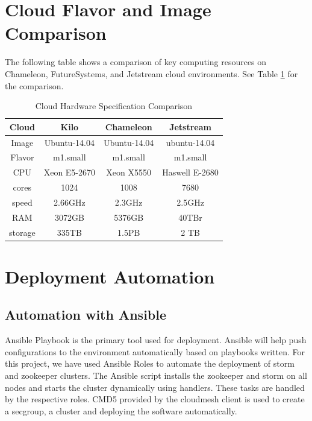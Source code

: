 \documentclass[9pt,twocolumn,twoside]{../../styles/osajnl}
\begin{document}
\section{Cloud Flavor and Image Comparison}
The following table shows a comparison of key computing resources on Chameleon, 
FutureSystems, and Jetstream cloud environments. See Table 
\ref{tab:cloud-comparison} for the comparison.

\begin{table}[h!]
\centering
\caption{ Cloud Hardware Specification Comparison }

\begin{tabular} {|c||c||c||c|}
\hline Cloud & Kilo & Chameleon & Jetstream \\ [0.5ex] \hline Image &
Ubuntu-14.04 & Ubuntu-14.04 & ubuntu-14.04 \\ \hline Flavor &m1.small
&m1.small & m1.small \\ \hline CPU & Xeon E5-2670 & Xeon X5550 &
Haswell E-2680 \\ \hline cores & 1024 & 1008 & 7680 \\ \hline speed &
2.66GHz & 2.3GHz & 2.5GHz\\ \hline RAM & 3072GB & 5376GB &
40TBr\\ \hline storage & 335TB & 1.5PB & 2 TB\\ [1ex] \hline
\end{tabular}
  \label{tab:cloud-comparison}
\end{table}

\section{Deployment Automation}

\subsection{Automation with Ansible}
Ansible Playbook is the primary tool used for deployment. Ansible will
help push configurations to the environment automatically based on
playbooks written. For this project, we have used Ansible Roles to
automate the deployment of storm and zookeeper clusters. The Ansible
script installs the zookeeper and storm on all nodes and starts the
cluster dynamically using handlers. These tasks are handled by the
respective roles. CMD5 provided by the cloudmesh client is used to
create a secgroup, a cluster and deploying the software automatically.
\end{document}
